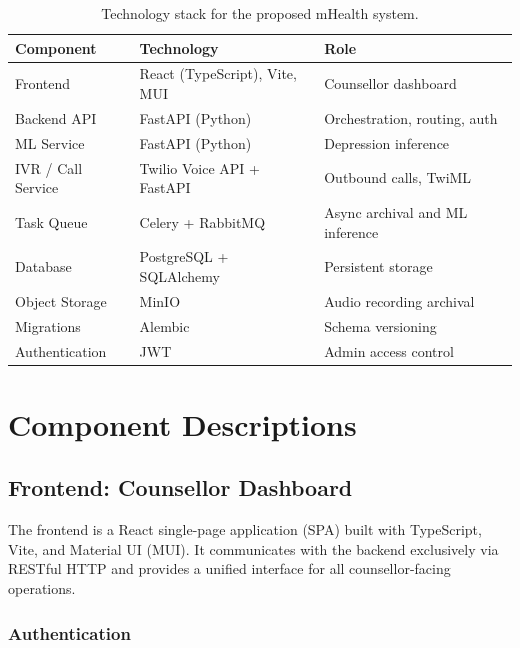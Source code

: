 \begin{table}[h]
\centering
\caption{Technology stack for the proposed mHealth system.}
\label{tab:tech_stack}
\begin{tabular}{@{}lll@{}}
\toprule
\textbf{Component} & \textbf{Technology} & \textbf{Role} \\
\midrule
Frontend           & React (TypeScript), Vite, MUI & Counsellor dashboard \\
Backend API        & FastAPI (Python)               & Orchestration, routing, auth \\
ML Service         & FastAPI (Python)               & Depression inference \\
IVR / Call Service & Twilio Voice API + FastAPI     & Outbound calls, TwiML \\
Task Queue         & Celery + RabbitMQ             & Async archival and ML inference \\
Database           & PostgreSQL + SQLAlchemy        & Persistent storage \\
Object Storage     & MinIO                         & Audio recording archival \\
Migrations         & Alembic                       & Schema versioning \\
Authentication     & JWT                           & Admin access control \\
\bottomrule
\end{tabular}
\end{table}

\section{Component Descriptions}

\subsection{Frontend: Counsellor Dashboard}

The frontend is a React single-page application (SPA) built with TypeScript, Vite, and Material UI (MUI). It communicates with the backend exclusively via RESTful HTTP and provides a unified interface for all counsellor-facing operations.

\subsubsection{Authentication}

